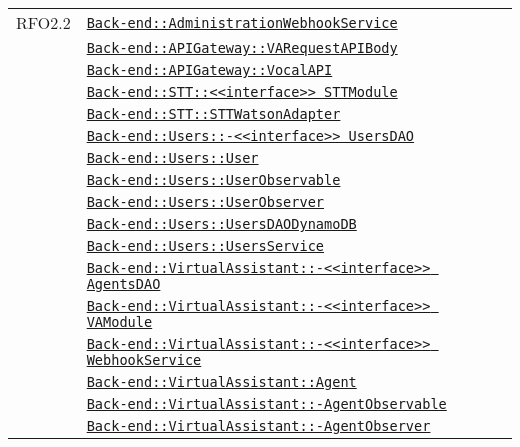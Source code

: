 \begin{longtable}{|>{\centering}m{3cm}|m{10cm}<{\centering}|}
RFO2.2 & \hyperref[Back-end::AdministrationWebhookService]{\texttt{Back-end::AdministrationWebhookService}}\\
& \hyperref[Back-end::APIGateway::VARequestAPIBody]{\texttt{Back-end::APIGateway::VARequestAPIBody}}\\
& \hyperref[Back-end::APIGateway::VocalAPI]{\texttt{Back-end::APIGateway::VocalAPI}}\\
& \hyperref[Back-end::STT::<<interface>> STTModule]{\texttt{Back-end::STT::<<interface>> STTModule}}\\
& \hyperref[Back-end::STT::STTWatsonAdapter]{\texttt{Back-end::STT::STTWatsonAdapter}}\\
& \hyperref[Back-end::Users::<<interface>> UsersDAO]{\texttt{Back-end::Users::-\linebreak <<interface>> UsersDAO}}\\
& \hyperref[Back-end::Users::User]{\texttt{Back-end::Users::User}}\\
& \hyperref[Back-end::Users::UserObservable]{\texttt{Back-end::Users::UserObservable}}\\
& \hyperref[Back-end::Users::UserObserver]{\texttt{Back-end::Users::UserObserver}}\\
& \hyperref[Back-end::Users::UsersDAODynamoDB]{\texttt{Back-end::Users::UsersDAODynamoDB}}\\
& \hyperref[Back-end::Users::UsersService]{\texttt{Back-end::Users::UsersService}}\\
& \hyperref[Back-end::VirtualAssistant::<<interface>> AgentsDAO]{\texttt{Back-end::VirtualAssistant::-\linebreak <<interface>> AgentsDAO}}\\
& \hyperref[Back-end::VirtualAssistant::<<interface>> VAModule]{\texttt{Back-end::VirtualAssistant::-\linebreak <<interface>> VAModule}}\\
& \hyperref[Back-end::VirtualAssistant::<<interface>> WebhookService]{\texttt{Back-end::VirtualAssistant::-\linebreak <<interface>> WebhookService}}\\
& \hyperref[Back-end::VirtualAssistant::Agent]{\texttt{Back-end::VirtualAssistant::Agent}}\\
& \hyperref[Back-end::VirtualAssistant::AgentObservable]{\texttt{Back-end::VirtualAssistant::-\linebreak AgentObservable}}\\
& \hyperref[Back-end::VirtualAssistant::AgentObserver]{\texttt{Back-end::VirtualAssistant::-\linebreak AgentObserver}}\\

\end{longtable}
